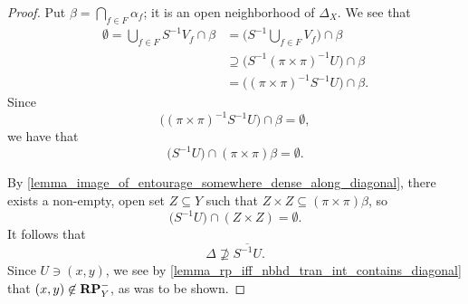 \begin{proof}
    Put $\beta = \bigcap_{f \in F} \alpha_f$; it is an open neighborhood of $\Delta_X$. We see that
    \begin{align*}
        \emptyset = \bigcup_{f \in F} S^{-1}V_f \cap \beta  &= \big( S^{-1} \bigcup_{f \in F} V_f \big) \cap \beta \\
        &\supseteq \big(S^{-1} (\pi \times \pi)^{-1} U \big) \cap \beta \\
        & = \big((\pi \times \pi)^{-1} S^{-1} U \big) \cap \beta.
    \end{align*}
    Since
    \[\big((\pi \times \pi)^{-1} S^{-1} U \big) \cap \beta = \emptyset,\]
    we have that
    \[\big(S^{-1} U \big) \cap (\pi \times \pi) \beta  = \emptyset.\]

    
    By \cref{lemma_image_of_entourage_somewhere_dense_along_diagonal}, there exists a non-empty, open set $Z \subseteq Y$ such that $Z \times Z \subseteq (\pi \times \pi) \beta$, so
    \[\big(S^{-1} U \big) \cap (Z \times Z)  = \emptyset.\]
    It follows that
    \[\Delta \not\supseteq \overline{S^{-1} U}.\]
    Since $U \ni (x,y)$, we see by \cref{lemma_rp_iff_nbhd_tran_int_contains_diagonal} that $(x,y) \not\in \mathbf{RP}^-_Y$, as was to be shown.
\end{proof}








